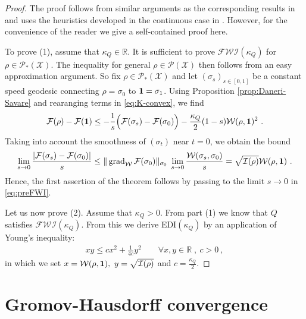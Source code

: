 \documentclass[a4paper,11pt,reqno]{amsart}
\theoremstyle{plain}
\theoremstyle{remark}
\numberwithin{equation}{section}
\begin{document}
\begin{proof}
  The proof follows from similar arguments as the corresponding
  results in \cite{EM11} and uses the heuristics developed in the
  continuous case in \cite{OV00}. However, for the convenience of the
  reader we give a self-contained proof here.

  To prove (1), assume that $\kappa_Q \in {{\mathbb R}}$. It is sufficient
  to prove ${\mathcal{F}}{\mathcal{W}}{\mathcal{I}}(\kappa_Q)$ for $\rho\in{\mathscr{P}}_*({\mathcal{X}})$. The inequality for
  general $\rho\in{{\mathscr{P}}({\mathcal{X}})}$ then follows from an easy approximation
  argument. So fix $\rho\in{\mathscr{P}}_*({\mathcal{X}})$ and let
  $(\sigma_s)_{s\in[0,1]}$ be a constant speed geodesic connecting
  $\rho=\sigma_0$ to ${{{\bf 1}}}=\sigma_1$.
  Using Proposition \ref{prop:Daneri-Savare}
  and rearanging terms in \eqref{eq:K-convex}, we find
  \begin{align}\label{eq:preFWI}
   {\mathcal{F}}(\rho) - {\mathcal{F}}({{{\bf 1}}})\leq - \frac{1}{s}\Big({\mathcal{F}}(\sigma_s)-{\mathcal{F}}(\sigma_0)\Big) - \frac{\kappa_Q}{2}(1-s){\mathcal{W}}(\rho,{{{\bf 1}}})^2\ .
  \end{align}
  Taking into account the smoothness of $(\sigma_t)$ near $t = 0$, we
  obtain the bound
  \begin{align*}
\lim_{s \to 0}\frac{|{\mathcal{F}}(\sigma_s)-{\mathcal{F}}(\sigma_0)|}{s} \leq \| \operatorname{grad}_{\mathcal{W}}{\mathcal{F}}(\sigma_0)\|_{\sigma_0}\;
\lim_{s \to 0}\frac{{\mathcal{W}}(\sigma_s,\sigma_0)}{s}=\sqrt{{\mathcal{I}}(\rho)}{\mathcal{W}}(\rho,{{{\bf 1}}})\ .
  \end{align*}
  Hence, the first assertion of the theorem follows by passing to the
  limit $s\to 0$ in \eqref{eq:preFWI}.

  Let us now prove (2). Assume that $\kappa_Q>0$. From part
  (1) we know that $Q$ satisfies ${\mathcal{F}}{\mathcal{W}}{\mathcal{I}}(\kappa_Q)$. From this we
  derive EDI$(\kappa_Q)$ by an application of Young's inequality:
\begin{align*}
x y \leq c x^2 +\frac{1}{4c}y^2\qquad \forall x,y\in{{\mathbb R}}\;, \ c>0\ ,
\end{align*}
  in which we set $x={\mathcal{W}}(\rho,{{{\bf 1}}}),\ y=\sqrt{{\mathcal{I}}(\rho)}$ and
  $c=\frac{\kappa_Q}{2}$.
\end{proof}

\section{Gromov-Hausdorff convergence}
\end{document}
